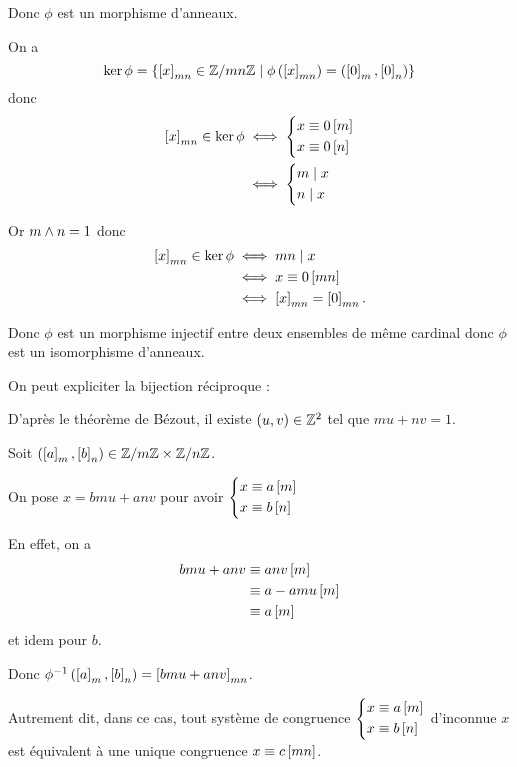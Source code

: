 \begin{dem}
Donc \(\phi\) est un morphisme d'anneaux.

On a \[\ker\phi=\left\lbrace\left[x\right]_{mn}\in\mathbb{Z}/mn\mathbb{Z}\;\middle|\;\phi\left(\left[x\right]_{mn}\right)=\left(\left[0\right]_m,\left[0\right]_n\right)\right\rbrace\] donc \[\begin{aligned}
\left[x\right]_{mn}\in\ker\phi&\iff\begin{dcases}
x\equiv0\left[m\right] \\
x\equiv0\left[n\right]
\end{dcases} \\
&\iff\begin{dcases}
m\mid x \\
n\mid x
\end{dcases}
\end{aligned}\]

Or \(m\land n=1\) donc \[\begin{aligned}
\left[x\right]_{mn}\in\ker\phi&\iff mn\mid x \\
&\iff x\equiv0\left[mn\right] \\
&\iff\left[x\right]_{mn}=\left[0\right]_{mn}.
\end{aligned}\]

Donc \(\phi\) est un morphisme injectif entre deux ensembles de même cardinal donc \(\phi\) est un isomorphisme d'anneaux.

On peut expliciter la bijection réciproque :

D'après le théorème de Bézout, il existe \(\left(u,v\right)\in\mathbb{Z}^2\) tel que \(mu+nv=1\).

Soit \(\left(\left[a\right]_m,\left[b\right]_n\right)\in\mathbb{Z}/m\mathbb{Z}\times\mathbb{Z}/n\mathbb{Z}\).

On pose \(x=bmu+anv\) pour avoir \(\begin{dcases}
x\equiv a\left[m\right] \\
x\equiv b\left[n\right]
\end{dcases}\)

En effet, on a \[\begin{aligned}
bmu+anv&\equiv anv\left[m\right] \\
&\equiv a-amu\left[m\right] \\
&\equiv a\left[m\right]
\end{aligned}\] et idem pour \(b\).

Donc \(\phi^{-1}\left(\left[a\right]_m,\left[b\right]_n\right)=\left[bmu+anv\right]_{mn}\).
\end{dem}

Autrement dit, dans ce cas, tout système de congruence \(\begin{dcases}
x\equiv a\left[m\right] \\
x\equiv b\left[n\right]
\end{dcases}\) d'inconnue \(x\) est équivalent à une unique congruence \(x\equiv c\left[mn\right]\).

